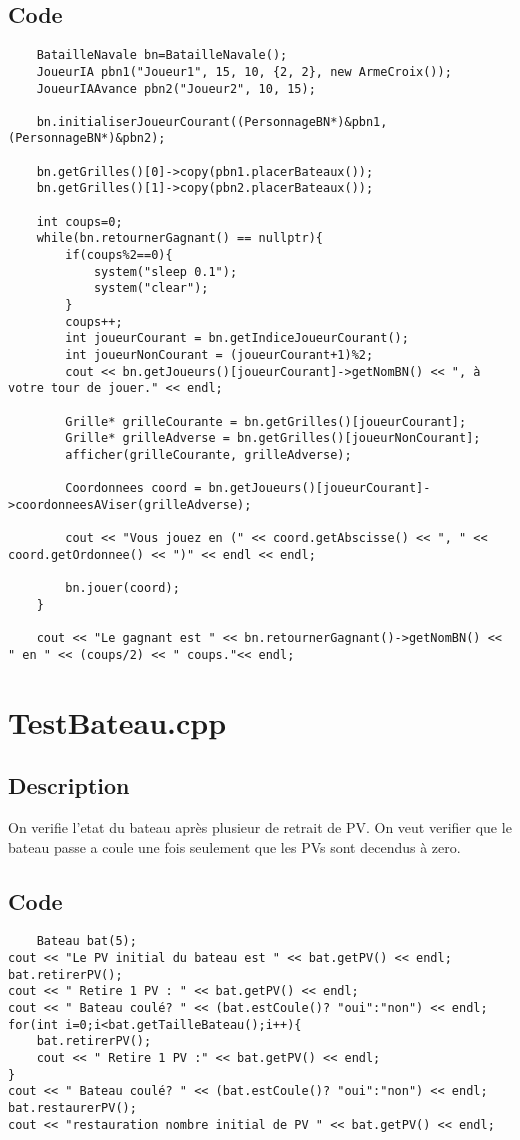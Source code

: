         \subsection{Code}
\begin{lstlisting}
	BatailleNavale bn=BatailleNavale();
    JoueurIA pbn1("Joueur1", 15, 10, {2, 2}, new ArmeCroix());
    JoueurIAAvance pbn2("Joueur2", 10, 15);

    bn.initialiserJoueurCourant((PersonnageBN*)&pbn1,(PersonnageBN*)&pbn2);

    bn.getGrilles()[0]->copy(pbn1.placerBateaux());
    bn.getGrilles()[1]->copy(pbn2.placerBateaux());

    int coups=0;
    while(bn.retournerGagnant() == nullptr){
        if(coups%2==0){
            system("sleep 0.1");
            system("clear");
        }
        coups++;
        int joueurCourant = bn.getIndiceJoueurCourant();
        int joueurNonCourant = (joueurCourant+1)%2;
        cout << bn.getJoueurs()[joueurCourant]->getNomBN() << ", à votre tour de jouer." << endl;

        Grille* grilleCourante = bn.getGrilles()[joueurCourant];
        Grille* grilleAdverse = bn.getGrilles()[joueurNonCourant];
        afficher(grilleCourante, grilleAdverse);

        Coordonnees coord = bn.getJoueurs()[joueurCourant]->coordonneesAViser(grilleAdverse);

        cout << "Vous jouez en (" << coord.getAbscisse() << ", " << coord.getOrdonnee() << ")" << endl << endl;

        bn.jouer(coord);
    }

    cout << "Le gagnant est " << bn.retournerGagnant()->getNomBN() << " en " << (coups/2) << " coups."<< endl;
	\end{lstlisting}
    \section{TestBateau.cpp}
        \subsection{Description}
            On verifie l'etat du bateau après plusieur de retrait de PV. On veut verifier que le bateau passe a coule une fois seulement que les PVs sont decendus à zero.
        \subsection{Code}
\begin{lstlisting}
	Bateau bat(5);
cout << "Le PV initial du bateau est " << bat.getPV() << endl;
bat.retirerPV();
cout << " Retire 1 PV : " << bat.getPV() << endl;
cout << " Bateau coulé? " << (bat.estCoule()? "oui":"non") << endl;
for(int i=0;i<bat.getTailleBateau();i++){
	bat.retirerPV();
	cout << " Retire 1 PV :" << bat.getPV() << endl;
}
cout << " Bateau coulé? " << (bat.estCoule()? "oui":"non") << endl;
bat.restaurerPV();
cout << "restauration nombre initial de PV " << bat.getPV() << endl;
	\end{lstlisting}
